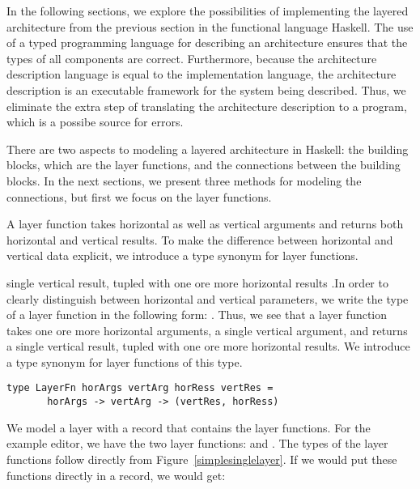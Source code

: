 \documentclass[preprint,natbib]{sigplanconf}
\begin{document}
In the following sections, we explore the possibilities of implementing the layered architecture from the previous section in the functional language Haskell. The use of a typed programming language for describing an architecture ensures that the types of all components are correct. Furthermore, because the architecture description language is equal to the implementation language, the architecture description is an executable framework for the system being described. Thus, we eliminate the extra step of translating the architecture description to a program, which is a possibe source for errors.


There are two aspects to modeling a layered architecture in Haskell: the building blocks, which are the layer functions, and the connections between the building blocks. In the next sections, we present three methods for modeling the connections, but first we focus on the layer functions. 

A layer function takes  horizontal as well as vertical arguments and returns both  horizontal and vertical results. To make the difference between horizontal and vertical data explicit, we introduce a type synonym for layer functions.

\bc single vertical result, tupled with one ore more horizontal results .In order to clearly distinguish between horizontal and vertical parameters, we write the type of a layer function in the following form: . Thus, we see that a layer function takes one ore more horizontal arguments, a single vertical argument, and returns a single vertical result, tupled with one ore more horizontal results. We introduce a type synonym for layer functions of this type. \ec


\begin{small}
\begin{verbatim}
type LayerFn horArgs vertArg horRess vertRes =
       horArgs -> vertArg -> (vertRes, horRess)
\end{verbatim}
\end{small}

We model a layer with a record that contains the layer functions. For the example editor, we have the two layer functions:  and . The types of the layer functions follow directly from Figure~\ref{simplesinglelayer}.  If we would put these functions directly in a record, we would get:
\end{document}
